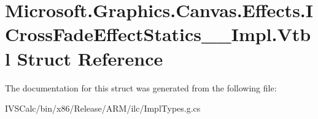\hypertarget{struct_microsoft_1_1_graphics_1_1_canvas_1_1_effects_1_1_i_cross_fade_effect_statics_____impl_1_1_vtbl}{}\section{Microsoft.\+Graphics.\+Canvas.\+Effects.\+I\+Cross\+Fade\+Effect\+Statics\+\_\+\+\_\+\+Impl.\+Vtbl Struct Reference}
\label{struct_microsoft_1_1_graphics_1_1_canvas_1_1_effects_1_1_i_cross_fade_effect_statics_____impl_1_1_vtbl}


The documentation for this struct was generated from the following file\+:\begin{DoxyCompactItemize}
\item 
I\+V\+S\+Calc/bin/x86/\+Release/\+A\+R\+M/ilc/Impl\+Types.\+g.\+cs\end{DoxyCompactItemize}
